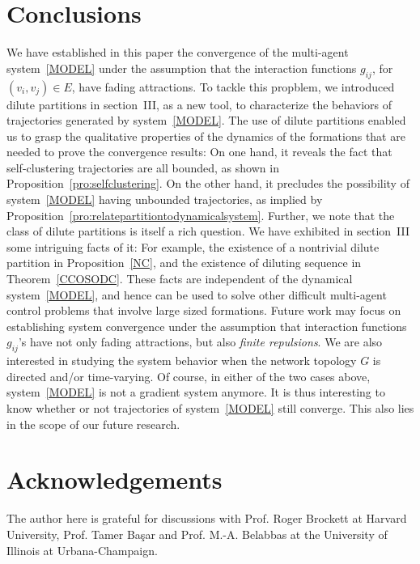 \documentclass[10pt,twocolumn,twoside]{IEEEtran}
\renewcommand{\(}{\left (}
\renewcommand{\)}{\right )}
\renewcommand{\;}{\,;\,}
\begin{document}
\section{Conclusions}
We have established in this paper the convergence of the multi-agent system~\eqref{MODEL} under the assumption that the interaction functions $g_{ij}$, for $(v_i,v_j) \in E$, have fading attractions. 
To tackle this propblem, we introduced dilute partitions in section~III, as a new tool, to characterize the behaviors of trajectories generated by system~\eqref{MODEL}.  The use of dilute partitions  enabled us to grasp the qualitative properties of the dynamics of the formations that are needed to prove the convergence results:  On one hand, it reveals the fact that self-clustering trajectories are all bounded, as shown in Proposition~\ref{pro:selfclustering}. On the other hand, it precludes the possibility of system~\eqref{MODEL} having unbounded trajectories, as implied by Proposition~\ref{pro:relatepartitiontodynamicalsystem}.  
Further, we note that the class of dilute partitions is itself a rich question. We have exhibited in section~III some intriguing facts of it: For example, the existence of a nontrivial dilute partition in Proposition~\ref{NC}, and the existence of diluting sequence in Theorem~\ref{CCOSODC}.   These facts are independent of the dynamical system~\eqref{MODEL}, and hence can be used to solve other difficult multi-agent control problems that involve large sized formations.  Future work may focus on establishing system convergence under the assumption that interaction functions $g_{ij}$'s have not only fading attractions, but also {\em finite repulsions}. We are also interested in studying the system behavior when the network topology $G$ is directed and/or time-varying. Of course, in either of the two cases above, system~\eqref{MODEL} is not a gradient system anymore. It is thus interesting to know whether or not trajectories of system~\eqref{MODEL} still converge. This also lies in the scope of our future research. 




\section*{Acknowledgements}
The author here is grateful for discussions with Prof. Roger Brockett at Harvard University, Prof. Tamer Ba\c sar and Prof. M.-A. Belabbas at the University of Illinois at Urbana-Champaign.  
\end{document}
